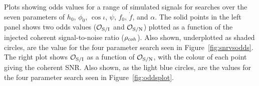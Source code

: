 \label{fig:snrvsodds_larger}
Plots showing odds values for a range of simulated signals for searches over the seven parameters of $h_0$, $\phi_0$,
$\cos{\iota}$, $\psi$, $f_0$, $\dot{f}$, and $\alpha$. The solid points in the left panel shows two odds values
($\mathcal{O}_{\rm S/I}$ and $\mathcal{O}_{\rm S/N}$) plotted as a function of the injected coherent signal-to-noise ratio
($\rho_{\text coh}$). Also shown, underplotted as shaded circles, are the value for the four parameter search seen in
Figure~\ref{fig:snrvsodds}. The right plot shows $\mathcal{O}_{\rm S/I}$ as a function of $\mathcal{O}_{\rm S/N}$, with
the colour of each point giving the coherent SNR. Also shown, as the light blue circles, are the values for the four
parameter search seen in Figure~\ref{fig:oddsplot}.
